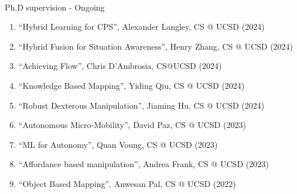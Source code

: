 \documentclass{article}
\begin{document}
\begin{cv}


\begin{cvlist}{~}

\item[Ph.D supervision - Ongoing]\ \\
  \begin{enumerate}
  \item ``Hybrid Learning for CPS'', Alexander Langley, CS @ UCSD (2024)
  \item ``Hybrid Fusion for Situation Awareness'', Henry Zhang, CS @  UCSD (2024)
  \item ``Achieving Flow'', Chris D'Ambrosia, CS@UCSD (2024)
  \item ``Knowledge Based Mapping'', Yiding Qiu, CS @ UCSD (2024)
  \item ``Robust Dexterous Manipulation'', Jiaming Hu, CS @ UCSD (2024)
  \item ``Autonomous Micro-Mobility'', David Paz, CS @ UCSD (2023)
  \item ``ML for Autonomy'', Quan Voung, CS @ UCSD (2023)
  \item ``Affordance based manipulation'', Andrea Frank, CS @ UCSD (2023)
  \item ``Object Based Mapping'', Anwesan Pal, CS @ UCSD (2022)
  \end{enumerate}


\end{cvlist}
\end{cv}
\end{document}
